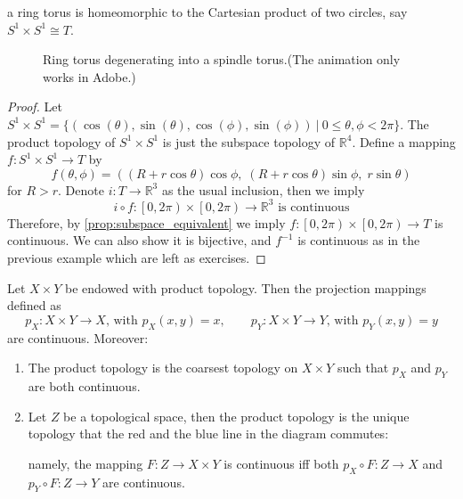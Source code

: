 \begin{proposition} a ring torus is homeomorphic to the Cartesian product of two circles, say \({S}^{1} \times  {S}^{1} \cong  T\).
\end{proposition}
\begin{figure}[h]
  \centering
  \caption{Ring torus degenerating into a spindle torus.(The animation only works in Adobe.)}
\end{figure}

\begin{proof} 
Let $S^1 \times S^1 = \{(\cos(\theta),\sin(\theta),\cos(\phi),\sin(\phi))\ |\ 0 \leq \theta,\phi <2\pi\}$. The product topology of $S^1 \times S^1$ is just the subspace topology of $\mathbb{R}^4$. Define a mapping \(f : S^1  \times  S^1   \rightarrow  T\) by
\[
f\left({\theta,\phi}\right)  = \left({\left({R + r\cos \theta}\right) \cos \phi,\;\left({R + r\cos \theta}\right) \sin \phi,\;r\sin \theta}\right)
\]
for $R > r$. Denote \(i : T \rightarrow  {\mathbb{R}}^{3}\) as the usual inclusion, then we imply
\[
i \circ  f : \left\lbrack  {0,{2\pi}}\right)   \times  \left\lbrack  {0,{2\pi}}\right)   \rightarrow  {\mathbb{R}}^{3}\text{ is continuous}
\]
Therefore, by \autoref{prop:subspace_equivalent} we imply \(f : \left\lbrack  {0,{2\pi}}\right)   \times  \left\lbrack  {0,{2\pi}}\right)   \rightarrow  T\) is continuous. We can also show it is bijective, and \({f}^{-1}\) is continuous as in the previous example which are left as exercises.
\end{proof}

\begin{proposition} Let \(X \times  Y\) be endowed with product topology. Then the projection mappings defined as
\[
p_X : X \times  Y \rightarrow  X\text{, with }p_X\left({x,y}\right)  = x, \quad \quad 
p_Y : X \times  Y \rightarrow  Y\text{, with }p_Y\left({x,y}\right)  = y
\]
are continuous. Moreover:
\begin{enumerate}
    \item The product topology is the coarsest topology on \(X \times  Y\) such that \(p_X\) and \(p_Y\) are both continuous.

    \item Let \(Z\) be a topological space, then the product topology is the unique topology that the red and the blue line in the diagram commutes:
\begin{center}
\end{center}
namely, the mapping \(F : Z \rightarrow  X \times  Y\) is continuous iff both \(p_X \circ  F : Z \rightarrow  X\) and
\(p_Y \circ  F : Z \rightarrow  Y\) are continuous.
\end{enumerate}
\end{proposition}

